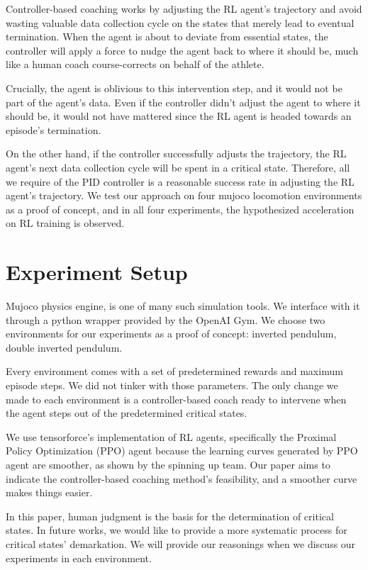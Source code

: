 \documentclass[journal]{IEEEtran}
\begin{document}
Controller-based coaching works by adjusting the RL agent's trajectory and avoid wasting valuable data collection cycle on the states that merely lead to eventual termination. When the agent is about to deviate from essential states, the controller will apply a force to nudge the agent back to where it should be, much like a human coach course-corrects on behalf of the athlete. 

Crucially, the agent is oblivious to this intervention step, and it would not be part of the agent's data. Even if the controller didn't adjust the agent to where it should be, it would not have mattered since the RL agent is headed towards an episode's termination. 

On the other hand, if the controller successfully adjusts the trajectory, the RL agent's next data collection cycle will be spent in a critical state. Therefore, all we require of the PID controller is a reasonable success rate in adjusting the RL agent's trajectory. We test our approach on four mujoco locomotion environments as a proof of concept, and in all four experiments, the hypothesized acceleration on RL training is observed.

\section{Experiment Setup}
Mujoco physics engine\cite{6386109}, is one of many such simulation tools. We interface with it through a python wrapper provided by the OpenAI Gym\cite{Brockman2016OpenAIG}. We choose two environments for our experiments as a proof of concept: inverted pendulum, double inverted pendulum. 

Every environment comes with a set of predetermined rewards and maximum episode steps. We did not tinker with those parameters. The only change we made to each environment is a controller-based coach ready to intervene when the agent steps out of the predetermined critical states.

We use tensorforce's\cite{tensorforce} implementation of RL agents, specifically the Proximal Policy Optimization (PPO) agent because the learning curves generated by PPO agent are smoother, as shown by the spinning up\cite{SpinningUp2018} team. Our paper aims to indicate the controller-based coaching method's feasibility, and a smoother curve makes things easier. 

In this paper, human judgment is the basis for the determination of critical states. In future works, we would like to provide a more systematic process for critical states' demarkation. We will provide our reasonings when we discuss our experiments in each environment. 
\end{document}
